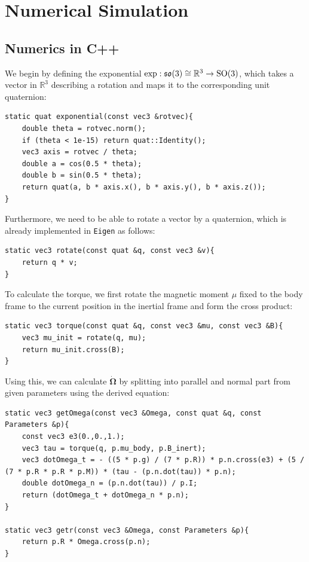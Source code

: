 \chapter{Numerical Simulation}
\label{chap:numsim}
\vspace*{-0.9cm}


\section{Numerics in C++}
We begin by defining the exponential $\exp: \operatorname{\mathfrak{s}\mathfrak{o}}(3)\cong \mathbb{R}^3 \to \operatorname{SO}(3)$, which takes a vector in $\mathbb{R}^3$ describing a rotation and maps it to the corresponding unit quaternion:
\begin{lstlisting}
static quat exponential(const vec3 &rotvec){
    double theta = rotvec.norm();
    if (theta < 1e-15) return quat::Identity();
    vec3 axis = rotvec / theta;
    double a = cos(0.5 * theta);
    double b = sin(0.5 * theta);
    return quat(a, b * axis.x(), b * axis.y(), b * axis.z());
}
\end{lstlisting}
Furthermore, we need to be able to rotate a vector by a quaternion, which is already implemented in \verb|Eigen| as follows:
\begin{lstlisting}
static vec3 rotate(const quat &q, const vec3 &v){
    return q * v;
}
\end{lstlisting}
To calculate the torque, we first rotate the magnetic moment $\mu$ fixed to the body frame to the current position in the inertial frame and form the cross product:
\begin{lstlisting}
static vec3 torque(const quat &q, const vec3 &mu, const vec3 &B){
    vec3 mu_init = rotate(q, mu);
    return mu_init.cross(B);
}
\end{lstlisting}
Using this, we can calculate $\dot{\bm{\Omega}}$ by splitting into parallel and normal part from given parameters using the derived equation:
\begin{lstlisting}
static vec3 getOmega(const vec3 &Omega, const quat &q, const Parameters &p){
    const vec3 e3(0.,0.,1.);
    vec3 tau = torque(q, p.mu_body, p.B_inert);
    vec3 dotOmega_t = - ((5 * p.g) / (7 * p.R)) * p.n.cross(e3) + (5 / (7 * p.R * p.R * p.M)) * (tau - (p.n.dot(tau)) * p.n);
    double dotOmega_n = (p.n.dot(tau)) / p.I;
    return (dotOmega_t + dotOmega_n * p.n);
}

static vec3 getr(const vec3 &Omega, const Parameters &p){
    return p.R * Omega.cross(p.n);
}
\end{lstlisting}
